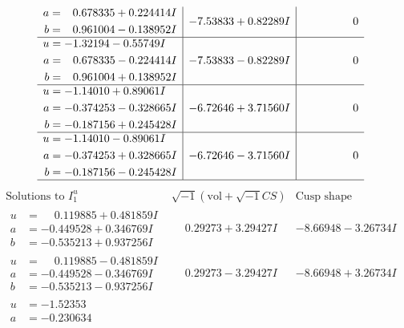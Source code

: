 \documentclass[1p]{elsarticle_modified}
\theoremstyle{definition}
\newcommand{\I}{\sqrt{-1}}
\begin{document}
$$\begin{array}{c|c|c}
\begin{aligned}
a &= \phantom{-}0.678335 + 0.224414 I \\
b &= \phantom{-}0.961004 - 0.138952 I\end{aligned}
 & -7.53833 + 0.82289 I & \phantom{-0.000000 } 0 \\ \hline\begin{aligned}
u &= -1.32194 - 0.55749 I \\
a &= \phantom{-}0.678335 - 0.224414 I \\
b &= \phantom{-}0.961004 + 0.138952 I\end{aligned}
 & -7.53833 - 0.82289 I & \phantom{-0.000000 } 0 \\ \hline\begin{aligned}
u &= -1.14010 + 0.89061 I \\
a &= -0.374253 - 0.328665 I \\
b &= -0.187156 + 0.245428 I\end{aligned}
 & -6.72646 + 3.71560 I & \phantom{-0.000000 } 0 \\ \hline\begin{aligned}
u &= -1.14010 - 0.89061 I \\
a &= -0.374253 + 0.328665 I \\
b &= -0.187156 - 0.245428 I\end{aligned}
 & -6.72646 - 3.71560 I & \phantom{-0.000000 } 0\\
 \hline 
 \end{array}$$\newpage$$\begin{array}{c|c|c}  
\text{Solutions to }I^u_{1}& \I (\text{vol} + \sqrt{-1}CS) & \text{Cusp shape}\\
 \hline 
\begin{aligned}
u &= \phantom{-}0.119885 + 0.481859 I \\
a &= -0.449528 + 0.346769 I \\
b &= -0.535213 + 0.937256 I\end{aligned}
 & \phantom{-}0.29273 + 3.29427 I & -8.66948 - 3.26734 I \\ \hline\begin{aligned}
u &= \phantom{-}0.119885 - 0.481859 I \\
a &= -0.449528 - 0.346769 I \\
b &= -0.535213 - 0.937256 I\end{aligned}
 & \phantom{-}0.29273 - 3.29427 I & -8.66948 + 3.26734 I \\ \hline\begin{aligned}
u &= -1.52353\phantom{ +0.000000I} \\
a &= -0.230634\phantom{ +0.000000I} \\

\end{aligned}
\end{array}$$
\end{document}
